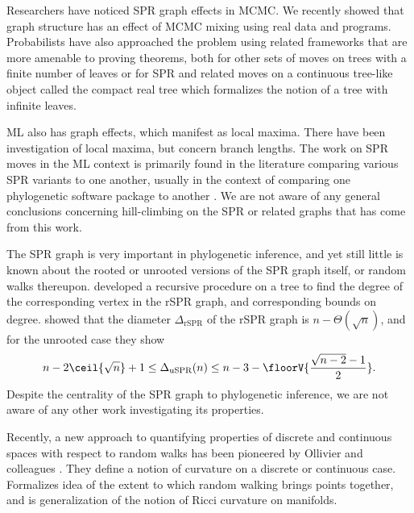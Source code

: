 \documentclass{amsart}
\begin{document}
Researchers have noticed SPR graph effects in MCMC.
\cite{Mossel2005-ly,Mossel2006-fo}
\cite{Ronquist2006-fv}
\cite{Stefankovic2011-hu}
We recently showed that graph structure has an effect of MCMC mixing using real data and programs.
\cite{Whidden2015-yi}
Probabilists have also approached the problem using related frameworks that are more amenable to proving theorems, both for other sets of moves on trees with a finite number of leaves \cite{Aldous2000-vg,Diaconis2002-gy} or for SPR and related moves on a continuous tree-like object called the compact real tree which formalizes the notion of a tree with infinite leaves\cite{Evans2006-xh,Athreya2014-de}.

ML also has graph effects, which manifest as local maxima.
There have been investigation of local maxima, but concern branch lengths.
\cite{Fukami1989-fs,Steel1994-pt,Chor2003-wh,Chor2000-ea}
The work on SPR moves in the ML context is primarily found in the literature comparing various SPR variants to one another, usually in the context of comparing one phylogenetic software package to another \cite{Hordijk2005-dl,Stamatakis2006-yz,Price2010-fi,Guindon2010-lo}.
We are not aware of any general conclusions concerning hill-climbing on the SPR or related graphs that has come from this work.

The SPR graph is very important in phylogenetic inference, and yet still little is known about the rooted or unrooted versions of the SPR graph itself, or random walks thereupon.
\cite{Song2003-gf} developed a recursive procedure on a tree to find the degree of the corresponding vertex in the rSPR graph, and corresponding bounds on degree.
\cite{Ding2011-bj} showed that the diameter $\Delta_{\text{rSPR}}$ of the rSPR graph is $n - \Theta(\sqrt n)$, and for the unrooted case they show
$$ n - 2\ceil{\sqrt{n}} + 1
\le \Delta_{\text{uSPR}}(n)
\le n - 3 - \floorV{\frac{\sqrt{n - 2} - 1}{2}}.
$$
Despite the centrality of the SPR graph to phylogenetic inference, we are not aware of any other work investigating its properties.

Recently, a new approach to quantifying properties of discrete and continuous spaces with respect to random walks has been pioneered by Ollivier and colleagues \cite{Ollivier2009-bw,Joulin2010-jg}.
They define a notion of curvature on a discrete or continuous case.
Formalizes idea of the extent to which random walking brings points together, and is generalization of the notion of Ricci curvature on manifolds.
\end{document}
